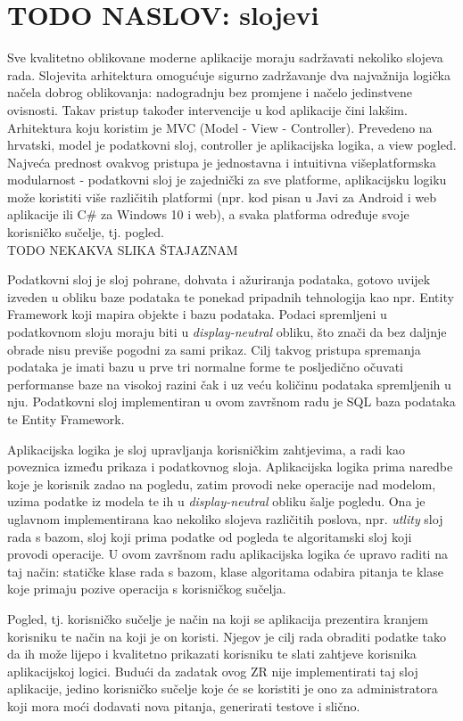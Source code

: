 \documentclass[times, utf8, zavrsni]{fer}
\begin{document}
\chapter{TODO NASLOV: slojevi}
Sve kvalitetno oblikovane moderne aplikacije moraju sadržavati nekoliko slojeva rada. Slojevita arhitektura omogućuje sigurno zadržavanje dva najvažnija logička načela dobrog oblikovanja: nadogradnju bez promjene i načelo jedinstvene ovisnosti. Takav pristup također intervencije u kod aplikacije čini lakšim. Arhitektura koju koristim je MVC (Model - View - Controller). Prevedeno na hrvatski, model je podatkovni sloj, controller je aplikacijska logika, a view pogled. Najveća prednost ovakvog pristupa je jednostavna i intuitivna višeplatformska modularnost - podatkovni sloj je zajednički za sve platforme, aplikacijsku logiku može koristiti više različitih platformi (npr. kod pisan u Javi za Android i web aplikacije ili C\# za Windows 10 i web), a svaka platforma određuje svoje korisničko sučelje, tj. pogled.
\\TODO NEKAKVA SLIKA ŠTAJAZNAM
\par
Podatkovni sloj je sloj pohrane, dohvata i ažuriranja podataka, gotovo uvijek izveden u obliku baze podataka te ponekad pripadnih tehnologija kao npr. Entity Framework koji mapira objekte i bazu podataka. Podaci spremljeni u podatkovnom sloju moraju biti u \textit{display-neutral} obliku, što znači da bez daljnje obrade nisu previše pogodni za sami prikaz. Cilj takvog pristupa spremanja podataka je imati bazu u prve tri normalne forme te posljedično očuvati performanse baze na visokoj razini čak i uz veću količinu podataka spremljenih u nju. Podatkovni sloj implementiran u ovom završnom radu je SQL baza podataka te Entity Framework.
\par
Aplikacijska logika je sloj upravljanja korisničkim zahtjevima, a radi kao poveznica između prikaza i podatkovnog sloja. Aplikacijska logika prima naredbe koje je korisnik zadao na pogledu, zatim provodi neke operacije nad modelom, uzima podatke iz modela te ih u \textit{display-neutral} obliku šalje pogledu. Ona je uglavnom implementirana kao nekoliko slojeva različitih poslova, npr. \textit{utlity} sloj rada s bazom, sloj koji prima podatke od pogleda te algoritamski sloj koji provodi operacije. U ovom završnom radu aplikacijska logika će upravo raditi na taj način: statičke klase rada s bazom, klase algoritama odabira pitanja te klase koje primaju pozive operacija s korisničkog sučelja.
\par
Pogled, tj. korisničko sučelje je način na koji se aplikacija prezentira kranjem korisniku te način na koji je on koristi. Njegov je cilj rada obraditi podatke tako da ih može lijepo i kvalitetno prikazati korisniku te slati zahtjeve korisnika aplikacijskoj logici. Budući da zadatak ovog ZR nije implementirati taj sloj aplikacije, jedino korisničko sučelje koje će se koristiti je ono za administratora koji mora moći dodavati nova pitanja, generirati testove i slično.
\end{document}
